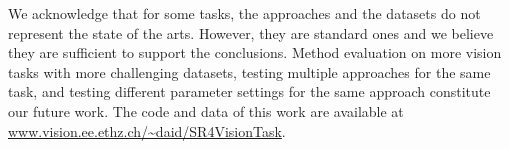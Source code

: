 We acknowledge that for some tasks, the approaches and the datasets do not represent the state of the arts.
However, they are standard ones and we believe they are sufficient to support the conclusions.   
Method evaluation on more vision tasks with more challenging datasets, 
testing multiple approaches for the same task, and testing
different parameter settings for the same approach constitute our future
work.  The code and data of this work are available at \url{www.vision.ee.ethz.ch/~daid/SR4VisionTask}.

%
%
%


%
